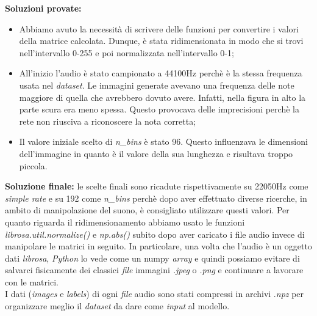 \newline
\textbf{Soluzioni provate:}
\begin{itemize}
	\item Abbiamo avuto la necessità di scrivere delle funzioni per convertire i valori della matrice calcolata. Dunque, è stata ridimensionata in modo che si trovi nell'intervallo 0-255 e poi normalizzata nell'intervallo 0-1;
	\item All'inizio l'audio è stato campionato a 44100Hz perchè è la stessa frequenza usata nel \textit{dataset}. Le immagini generate avevano una frequenza delle note maggiore di quella che avrebbero dovuto avere. Infatti, nella figura in alto la parte scura era meno spessa. Questo provocava delle imprecisioni perchè la rete non riusciva a riconoscere la nota corretta;
	\item Il valore iniziale scelto di \textit{n\_bins} è stato 96. Questo influenzava le dimensioni dell'immagine in quanto è il valore della sua lunghezza e risultava troppo piccola.
\end{itemize}
\textbf{Soluzione finale:} le scelte finali sono ricadute rispettivamente su 22050Hz come \textit{simple rate} e su 192 come \textit{n\_bins} perchè dopo aver effettuato diverse ricerche, in ambito di manipolazione del suono, è consigliato utilizzare questi valori. Per quanto riguarda il ridimensionamento abbiamo usato le funzioni \textit{librosa.util.normalize()} e \textit{np.abs()} subito dopo aver caricato i file audio invece di manipolare le matrici in seguito.
\vspace*{2ex}
\vspace*{2ex}
\noindent In particolare, una volta che l'audio è un oggetto dati \textit{librosa}, \textit{Python} lo vede come un numpy \textit{array} e quindi possiamo evitare di salvarci fisicamente dei classici \textit{file} immagini \textit{.jpeg} o \textit{.png} e continuare a lavorare con le matrici.\\
\newline
I dati (\textit{images} e \textit{labels}) di ogni \textit{file} audio sono stati compressi in archivi .\textit{npz} per organizzare meglio il \textit{dataset} da dare come \textit{input} al modello.
\vspace*{2ex}
\vspace*{2ex}
